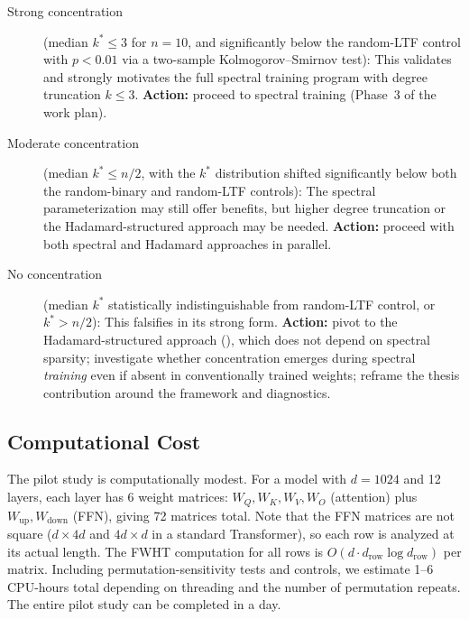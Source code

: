 \documentclass[12pt,a4paper]{article}
\theoremstyle{plain}
\theoremstyle{definition}
\theoremstyle{remark}
\begin{document}
\begin{description}
    \item[Strong concentration] (median $k^* \leq 3$ for $n = 10$, and significantly below the random-LTF control with $p < 0.01$ via a two-sample Kolmogorov--Smirnov test): This validates  and strongly motivates the full spectral training program with degree truncation $k \leq 3$. \textbf{Action:} proceed to spectral training (Phase~3 of the work plan).

    \item[Moderate concentration] (median $k^* \leq n/2$, with the $k^*$ distribution shifted significantly below both the random-binary and random-LTF controls): The spectral parameterization may still offer benefits, but higher degree truncation or the Hadamard-structured approach may be needed. \textbf{Action:} proceed with both spectral and Hadamard approaches in parallel.

    \item[No concentration] (median $k^*$ statistically indistinguishable from random-LTF control, or $k^* > n/2$): This falsifies  in its strong form. \textbf{Action:} pivot to the Hadamard-structured approach (), which does not depend on spectral sparsity; investigate whether concentration emerges during spectral \emph{training} even if absent in conventionally trained weights; reframe the thesis contribution around the framework and diagnostics.
\end{description}

\subsection{Computational Cost}

The pilot study is computationally modest. For a model with $d = 1024$ and 12 layers, each layer has 6 weight matrices: $W_Q, W_K, W_V, W_O$ (attention) plus $W_{\text{up}}, W_{\text{down}}$ (FFN), giving 72 matrices total. Note that the FFN matrices are not square ($d \times 4d$ and $4d \times d$ in a standard Transformer), so each row is analyzed at its actual length. The FWHT computation for all rows is $O(d \cdot d_{\text{row}} \log d_{\text{row}})$ per matrix. Including permutation-sensitivity tests and controls, we estimate 1--6 CPU-hours total depending on threading and the number of permutation repeats. The entire pilot study can be completed in a day.


\newpage
\end{document}
